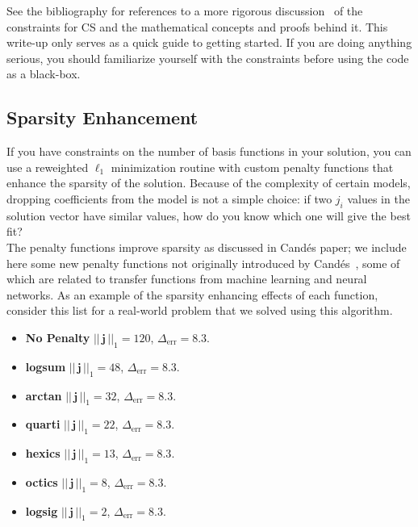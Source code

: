 \documentclass[paper=a4, fontsize=11pt]{scrartcl} %
\newcommand{\vectornorm}[1]{\left|\left|\,#1\,\right|\right|}
\numberwithin{equation}{section} %
\numberwithin{figure}{section} %
\numberwithin{table}{section} %
\begin{document}
See the bibliography for references to a more rigorous discussion~\cite{Ji:2008dd} of
the constraints for CS and the mathematical concepts and proofs behind
it. This write-up only serves as a quick guide to getting started. If
you are doing anything serious, you should familiarize yourself with
the constraints before using the code as a black-box.

\subsection{Sparsity Enhancement}

If you have constraints on the number of basis functions in your
solution, you can use a reweighted $\ell_1$ minimization routine with
custom penalty functions that enhance the sparsity of the
solution. Because of the complexity of certain models, dropping
coefficients from the model is not a simple choice: if two $j_i$
values in the solution vector have similar values, how do you know
which one will give the best fit?\\

The penalty functions improve sparsity as discussed in Cand\'es paper;
we include here some new penalty functions not originally introduced
by Cand\'es~\cite{Candes:2008hh}, some of which are related to transfer functions from
machine learning and neural networks. As an example of the sparsity
enhancing effects of each function, consider this list for a
real-world problem that we solved using this algorithm.

\begin{itemize}
\item \textbf{No Penalty} $\vectornorm{\mathbf{j}}_1 = 120$, $\Delta_{\textrm{err}}=8.3$.
\item \textbf{logsum} $\vectornorm{\mathbf{j}}_1 = 48$, $\Delta_{\textrm{err}}=8.3$.
\item \textbf{arctan} $\vectornorm{\mathbf{j}}_1 = 32$, $\Delta_{\textrm{err}}=8.3$.
\item \textbf{quarti} $\vectornorm{\mathbf{j}}_1 = 22$, $\Delta_{\textrm{err}}=8.3$.
\item \textbf{hexics} $\vectornorm{\mathbf{j}}_1 = 13$, $\Delta_{\textrm{err}}=8.3$.
\item \textbf{octics} $\vectornorm{\mathbf{j}}_1 = 8$, $\Delta_{\textrm{err}}=8.3$.
\item \textbf{logsig} $\vectornorm{\mathbf{j}}_1 = 2$, $\Delta_{\textrm{err}}=8.3$.
\end{itemize}
\end{document}

